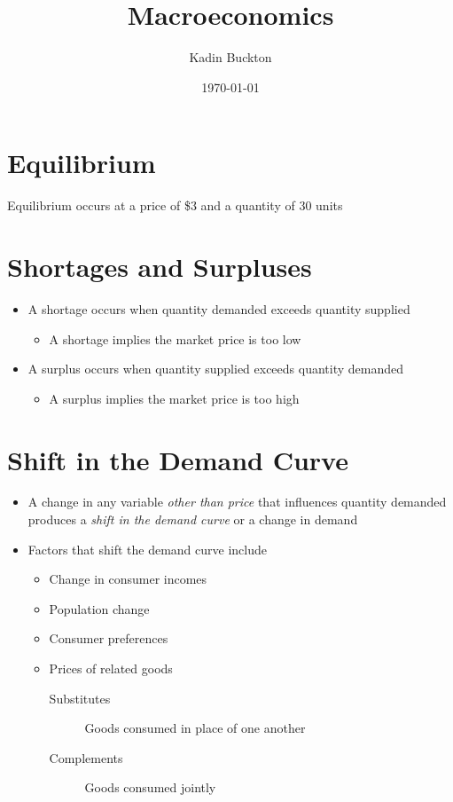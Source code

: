 \documentclass[11pt]{article}
\author{Kadin Buckton}
\date{\today}
\title{Macroeconomics}
\begin{document}
\maketitle
\section*{Equilibrium}
\label{sec:org9679033}
Equilibrium occurs at a price of \$3 and a quantity of 30 units

\section*{Shortages and Surpluses}
\label{sec:orgf6b583a}
\begin{itemize}
\item A shortage occurs when quantity demanded exceeds quantity supplied
\begin{itemize}
\item A shortage implies the market price is too low
\end{itemize}
\item A surplus occurs when quantity supplied exceeds quantity demanded
\begin{itemize}
\item A surplus implies the market price is too high
\end{itemize}
\end{itemize}

\section*{Shift in the Demand Curve}
\label{sec:orga6fded4}
\begin{itemize}
\item A change in any variable \emph{other than price} that influences quantity demanded produces a \emph{shift in the demand curve} or a change in demand
\item Factors that shift the demand curve include
\begin{itemize}
\item Change in consumer incomes
\item Population change
\item Consumer preferences
\item Prices of related goods
\begin{description}
\item[{Substitutes}] Goods consumed in place of one another
\item[{Complements}] Goods consumed jointly
\end{description}
\end{itemize}
\end{itemize}
\end{document}
